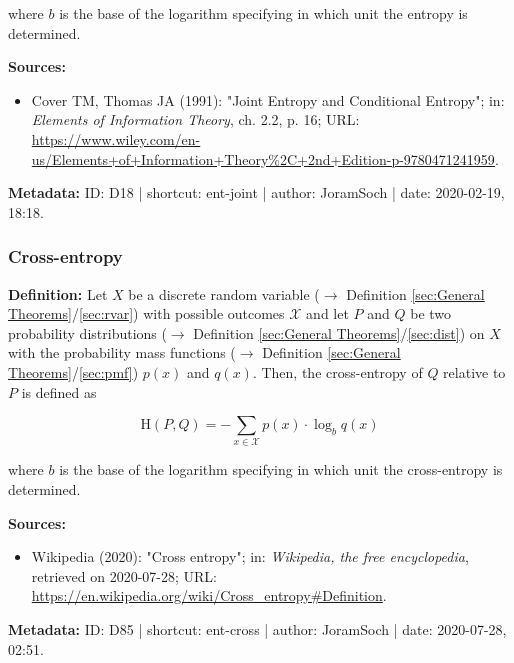 \documentclass[a4paper,12pt,twoside]{book}
\begin{document}
where $b$ is the base of the logarithm specifying in which unit the entropy is determined.


\vspace{1em}
\textbf{Sources:}
\begin{itemize}
\item Cover TM, Thomas JA (1991): "Joint Entropy and Conditional Entropy"; in: \textit{Elements of Information Theory}, ch. 2.2, p. 16; URL: \url{https://www.wiley.com/en-us/Elements+of+Information+Theory%2C+2nd+Edition-p-9780471241959}.
\end{itemize}


\vspace{1em}
\textbf{Metadata:} ID: D18 | shortcut: ent-joint | author: JoramSoch | date: 2020-02-19, 18:18.
\vspace{1em}



\subsubsection[\textit{Cross-entropy}]{Cross-entropy} \label{sec:ent-cross}
\setcounter{equation}{0}

\textbf{Definition:} Let $X$ be a discrete random variable ($\rightarrow$ Definition \ref{sec:General Theorems}/\ref{sec:rvar}) with possible outcomes $\mathcal{X}$ and let $P$ and $Q$ be two probability distributions ($\rightarrow$ Definition \ref{sec:General Theorems}/\ref{sec:dist}) on $X$ with the probability mass functions ($\rightarrow$ Definition \ref{sec:General Theorems}/\ref{sec:pmf}) $p(x)$ and $q(x)$. Then, the cross-entropy of $Q$ relative to $P$ is defined as

\begin{equation} \label{eq:ent-cross-ent-cross}
\mathrm{H}(P,Q) = - \sum_{x \in \mathcal{X}} p(x) \cdot \log_b q(x)
\end{equation}

where $b$ is the base of the logarithm specifying in which unit the cross-entropy is determined.


\vspace{1em}
\textbf{Sources:}
\begin{itemize}
\item Wikipedia (2020): "Cross entropy"; in: \textit{Wikipedia, the free encyclopedia}, retrieved on 2020-07-28; URL: \url{https://en.wikipedia.org/wiki/Cross_entropy#Definition}.
\end{itemize}


\vspace{1em}
\textbf{Metadata:} ID: D85 | shortcut: ent-cross | author: JoramSoch | date: 2020-07-28, 02:51.
\vspace{1em}
\end{document}
